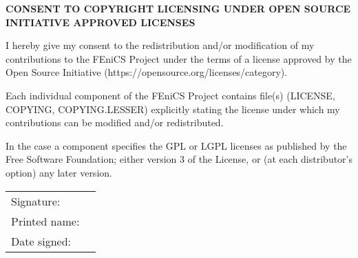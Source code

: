 \documentclass[11pt]{article}
\begin{document}
\pagestyle{empty}

\large

\begin{center}
  \textbf{CONSENT TO COPYRIGHT LICENSING UNDER OPEN SOURCE INITIATIVE APPROVED LICENSES}
\end{center}

\normalsize

\vspace{1cm}

I hereby give my consent to the redistribution and/or modification of my
contributions to the FEniCS Project\footnotemark{} under the terms of a license
approved by the Open Source Initiative (https://opensource.org/licenses/category). 

Each individual component of the FEniCS Project contains file(s) (LICENSE,
COPYING, COPYING.LESSER) explicitly stating the license under which my
contributions can be modified and/or redistributed.

In the case a component specifies the GPL or LGPL licenses as published by the Free
Software Foundation; either version 3 of the License, or (at each distributor's
option) any later version.

\vspace{2cm}

\begin{tabular}{ll}
Signature:     & \underline{\hspace{9cm}} \\[2cm]
Printed name:  & \underline{\hspace{9cm}} \\[2cm]
Date signed:   & \underline{\hspace{9cm}}
\end{tabular}


\end{document}
